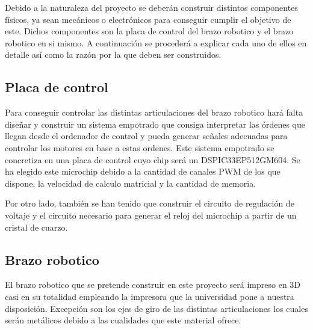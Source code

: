 Debido a la naturaleza del proyecto se deberán construir distintos componentes físicos, ya sean mecánicos o electrónicos para conseguir cumplir el objetivo de este. Dichos componentes son la placa de control del brazo robotico y el brazo robotico en si mismo. A continuación se procederá a explicar cada uno de ellos en detalle así como la razón por la que deben ser construidos.

\subsection{Placa de control}

Para conseguir controlar las distintas articulaciones del brazo robotico hará falta diseñar y construir un sistema empotrado que consiga interpretar las órdenes que llegan desde el ordenador de control y pueda generar señales adecuadas para controlar los motores en base a estas ordenes. Este sistema empotrado se concretiza en una placa de control cuyo chip será un DSPIC33EP512GM604. Se ha elegido este microchip debido a la cantidad de canales PWM de los que dispone, la velocidad de calculo matricial y la cantidad de memoria.

Por otro lado, también se han tenido que construir el circuito de regulación de voltaje y el circuito necesario para generar el reloj del microchip a partir de un cristal de cuarzo.

\subsection{Brazo robotico}

El brazo robotico que se pretende construir en este proyecto será impreso en 3D casi en su totalidad empleando la impresora que la universidad pone a nuestra disposición. Excepción son los ejes de giro de las distintas articulaciones los cuales serán metálicos debido a las cualidades que este material ofrece. 
